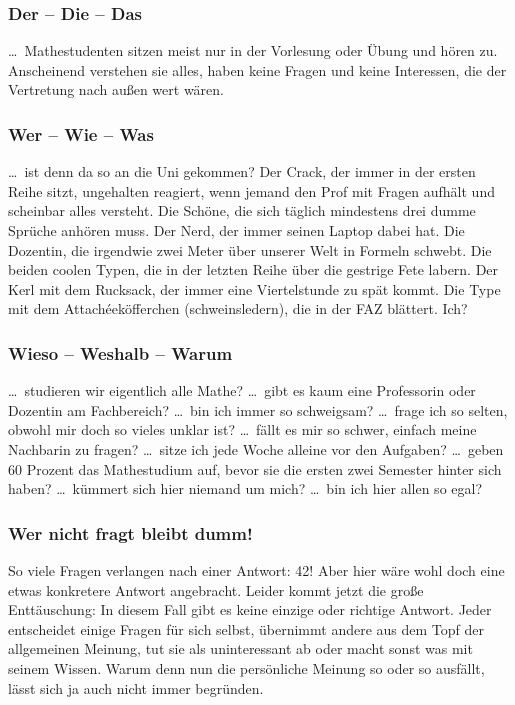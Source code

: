 \subsubsection{Der -- Die -- Das}

\dots\ Mathestudenten sitzen meist nur in der Vorlesung oder Übung und hören
zu.  Anscheinend verstehen sie alles, haben keine Fragen und keine Interessen,
die der Vertretung nach außen wert wären.

\subsubsection{Wer -- Wie -- Was}

\dots\ ist denn da so an die Uni gekommen? Der Crack, der immer in der ersten
Reihe sitzt, ungehalten reagiert, wenn jemand den Prof mit Fragen aufhält und
scheinbar alles versteht.  Die Schöne, die sich täglich mindestens drei dumme
Sprüche anhören muss. Der Nerd, der immer seinen Laptop dabei hat. Die
Dozentin, die irgendwie zwei Meter über unserer Welt in Formeln schwebt. Die
beiden coolen Typen, die in der letzten Reihe über die gestrige Fete labern.
Der Kerl mit dem Rucksack, der immer eine Viertelstunde zu spät kommt. Die Type
mit dem Attach\'eeköfferchen (schweinsledern), die in der FAZ blättert.  Ich?

\subsubsection{Wieso -- Weshalb -- Warum}

\dots\ studieren wir eigentlich alle Mathe? \dots\ gibt es kaum eine
Professorin oder Dozentin am Fachbereich? \dots\ bin ich immer so schweigsam?
\dots\ frage ich so selten, obwohl mir doch so vieles unklar ist? \dots\ fällt
es mir so schwer, einfach meine Nachbarin zu fragen? \dots\ sitze ich jede
Woche alleine vor den Aufgaben? \dots\ geben 60 Prozent das Mathestudium auf,
bevor sie die ersten zwei Semester hinter sich haben? \dots\ kümmert sich hier
niemand um mich? \dots\ bin ich hier allen so egal?

\subsubsection{Wer nicht fragt bleibt dumm!}

So viele Fragen verlangen nach einer Antwort: 42! Aber hier wäre wohl doch eine
etwas konkretere Antwort angebracht. Leider kommt jetzt die große Enttäuschung:
In diesem Fall gibt es keine einzige oder richtige Antwort. Jeder entscheidet
einige Fragen für sich selbst, übernimmt andere aus dem Topf der allgemeinen
Meinung, tut sie als uninteressant ab oder macht sonst was mit seinem Wissen.
Warum denn nun die persönliche Meinung so oder so ausfällt, lässt sich ja auch
nicht immer begründen.

